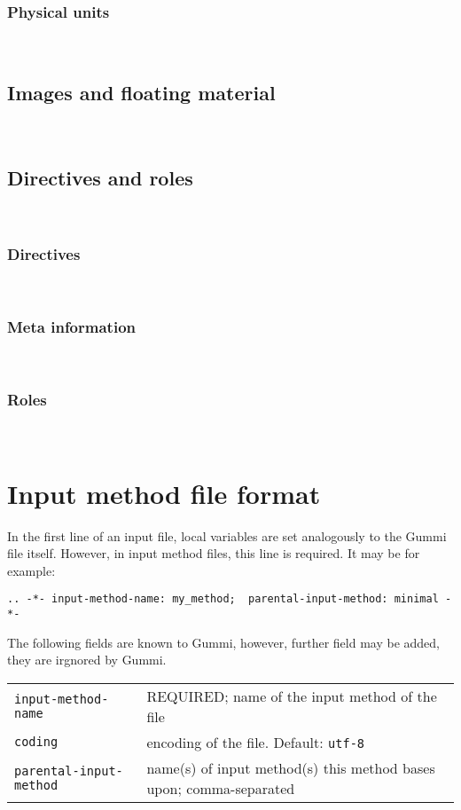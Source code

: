 \documentclass[12pt,openany]{book}
\begin{document}
~


\subsubsection{Physical units}

~

\subsection{Images and floating material}


~

\subsection{Directives and roles}

~

\subsubsection{Directives}

~

\subsubsection{Meta information}

~

\subsubsection{Roles}

~


\section{Input method file format}

In the first line of an input file, local variables are set analogously to the
Gummi file itself.  However, in input method files, this line is required.  It
may be for example:

\begin{lstlisting}
.. -*- input-method-name: my_method;  parental-input-method: minimal -*-
\end{lstlisting}

The following fields are known to Gummi, however, further field may be added,
they are irgnored by Gummi.

\begin{center}
\begin{tabular}{@{}lp{7cm}@{}}
  \toprule
  \verb|input-method-name| & REQUIRED; name of the input method of the file \\
  \verb|coding| & encoding of the file.  Default: \verb|utf-8|\\
  \verb|parental-input-method| & name(s) of input method(s) this method bases
  upon; comma-separated\\
  \bottomrule
\end{tabular}
\end{center}
\end{document}
